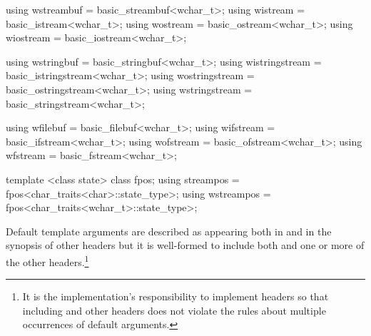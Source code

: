 \begin{codeblock}
{  using wstreambuf = basic_streambuf<wchar_t>;
  using wistream   = basic_istream<wchar_t>;
  using wostream   = basic_ostream<wchar_t>;
  using wiostream  = basic_iostream<wchar_t>;

  using wstringbuf     = basic_stringbuf<wchar_t>;
  using wistringstream = basic_istringstream<wchar_t>;
  using wostringstream = basic_ostringstream<wchar_t>;
  using wstringstream  = basic_stringstream<wchar_t>;

  using wfilebuf  = basic_filebuf<wchar_t>;
  using wifstream = basic_ifstream<wchar_t>;
  using wofstream = basic_ofstream<wchar_t>;
  using wfstream  = basic_fstream<wchar_t>;

  template <class state> class fpos;
  using streampos  = fpos<char_traits<char>::state_type>;
  using wstreampos = fpos<char_traits<wchar_t>::state_type>;
}
\end{codeblock}

\pnum
Default template arguments are described as appearing both in
and in the synopsis of other headers
but it is well-formed to include both
and one or more of the other headers.\footnote{It is the implementation's
responsibility to implement headers so
that including
and other headers does not violate the rules about
multiple occurrences of default arguments.}

